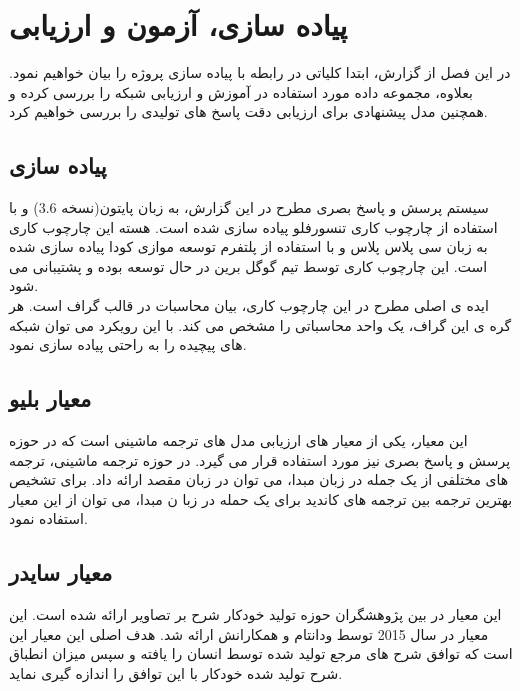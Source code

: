 \chapter{پیاده سازی، آزمون و ارزیابی}
در این فصل از گزارش، ابتدا کلیاتی در رابطه با پیاده سازی پروژه را بیان خواهیم نمود. بعلاوه، مجموعه داده مورد استفاده در آموزش و ارزیابی شبکه را بررسی کرده و همچنین مدل پیشنهادی برای ارزیابی دقت پاسخ های تولیدی را بررسی خواهیم کرد.
\section{پیاده سازی }
سیستم پرسش و پاسخ بصری مطرح در این گزارش، به زبان پایتون(نسخه 3.6) و با استفاده از چارچوب کاری تنسورفلو پیاده سازی شده است. هسته این چارچوب کاری به زبان سی پلاس پلاس و با استفاده از پلتفرم توسعه موازی کودا پیاده سازی شده است. این چارچوب کاری توسط تیم گوگل برین در حال توسعه بوده و پشتیبانی می شود.\\
ایده ی اصلی مطرح در این چارچوب کاری، بیان محاسبات در قالب گراف است. هر گره ی این گراف، یک واحد محاسباتی را مشخص می کند. با این رویکرد می توان شبکه های پیچیده را به راحتی پیاده سازی نمود.

\section{معیار بلیو}
این معیار، یکی از معیار های ارزیابی مدل های ترجمه ماشینی است که در حوزه پرسش و پاسخ بصری نیز مورد استفاده قرار می گیرد. در حوزه ترجمه ماشینی، ترجمه های مختلفی از یک جمله در زبان مبدا، می توان در زبان مقصد ارائه داد. برای تشخیص بهترین ترجمه بین ترجمه های کاندید برای یک حمله در زبا ن مبدا، می توان از این معیار استفاده نمود.


\section{معیار سایدر}
این معیار در بین پژوهشگران حوزه تولید خودکار شرح بر تصاویر ارائه شده است. این معیار در سال 2015 توسط ودانتام و همکارانش ارائه شد. هدف اصلی این معیار این است که توافق شرح های مرجع تولید شده توسط انسان را یافته و سپس میزان انطباق شرح تولید شده خودکار با این توافق را اندازه گیری نماید.







